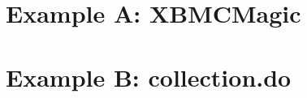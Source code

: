 

\part{Example A: XBMCMagic}
\label{part:xbmc}

\part{Example B: collection.do}
\label{part:collection}